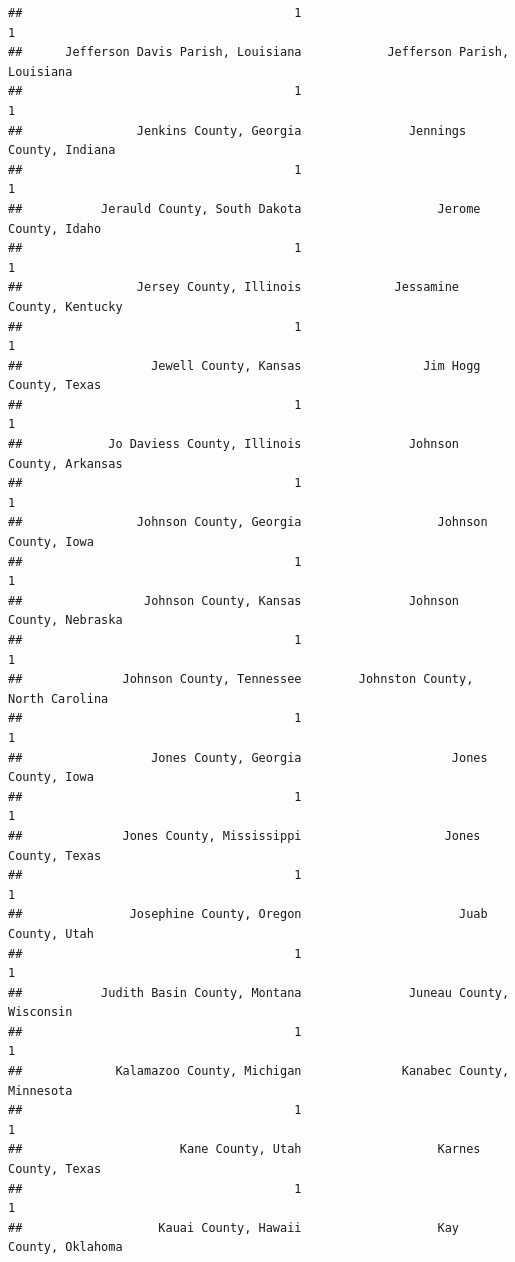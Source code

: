 \documentclass[
]{article}
\begin{document}
\begin{verbatim}
##                                      1                                      1 
##      Jefferson Davis Parish, Louisiana            Jefferson Parish, Louisiana 
##                                      1                                      1 
##                Jenkins County, Georgia               Jennings County, Indiana 
##                                      1                                      1 
##           Jerauld County, South Dakota                   Jerome County, Idaho 
##                                      1                                      1 
##                Jersey County, Illinois             Jessamine County, Kentucky 
##                                      1                                      1 
##                  Jewell County, Kansas                 Jim Hogg County, Texas 
##                                      1                                      1 
##            Jo Daviess County, Illinois               Johnson County, Arkansas 
##                                      1                                      1 
##                Johnson County, Georgia                   Johnson County, Iowa 
##                                      1                                      1 
##                 Johnson County, Kansas               Johnson County, Nebraska 
##                                      1                                      1 
##              Johnson County, Tennessee        Johnston County, North Carolina 
##                                      1                                      1 
##                  Jones County, Georgia                     Jones County, Iowa 
##                                      1                                      1 
##              Jones County, Mississippi                    Jones County, Texas 
##                                      1                                      1 
##               Josephine County, Oregon                      Juab County, Utah 
##                                      1                                      1 
##           Judith Basin County, Montana               Juneau County, Wisconsin 
##                                      1                                      1 
##             Kalamazoo County, Michigan              Kanabec County, Minnesota 
##                                      1                                      1 
##                      Kane County, Utah                   Karnes County, Texas 
##                                      1                                      1 
##                   Kauai County, Hawaii                   Kay County, Oklahoma 

\end{verbatim}
\end{document}
